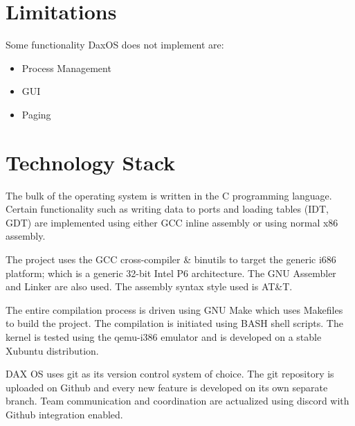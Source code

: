 \section{Limitations} \label{section:Limitations}
Some functionality DaxOS does not implement are:
\begin{itemize}
	\item Process Management
	\item GUI
	\item Paging
\end{itemize}

\section{Technology Stack} \label{section:Technology Stack}
The bulk of the operating system is written in the C programming language.
Certain functionality such as writing data to ports and loading tables (IDT, GDT) are implemented using either GCC inline assembly or using normal x86 assembly.

The project uses the GCC cross-compiler \& binutils to target the generic i686 platform; which is a generic 32-bit Intel P6 architecture.
The GNU Assembler and Linker are also used. The assembly syntax style used is AT\&T.

The entire compilation process is driven using GNU Make which uses Makefiles to build the project.
The compilation is initiated using BASH shell scripts.
The kernel is tested using the qemu-i386 emulator and is developed on a stable Xubuntu distribution. 

DAX OS uses git as its version control system of choice.
The git repository is uploaded on Github and every new feature is developed on its own separate branch.
Team communication and coordination are actualized using discord with Github integration enabled.


